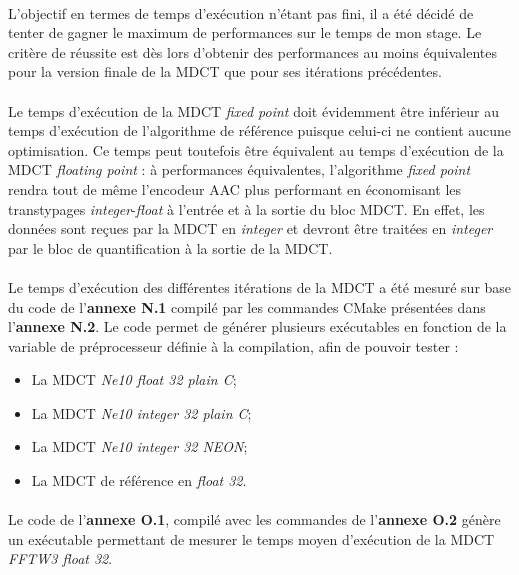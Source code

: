 \documentclass{article}
\begin{document}
    \paragraph{}
    L'objectif en termes de temps d'exécution n'étant pas fini, il a été décidé de tenter de gagner le maximum de performances sur le temps de mon stage. Le critère de réussite est dès lors d'obtenir des performances au moins équivalentes pour la version finale de la MDCT que pour ses itérations précédentes.

    \paragraph{}
    Le temps d'exécution de la MDCT \emph{fixed point} doit évidemment être inférieur au temps d'exécution de l'algorithme de référence puisque celui-ci ne contient aucune optimisation. Ce temps peut toutefois être équivalent au temps d'exécution de la MDCT \emph{floating point} : à performances équivalentes, l'algorithme \emph{fixed point} rendra tout de même l'encodeur AAC plus performant en économisant les transtypages \emph{integer}-\emph{float} à l'entrée et à la sortie du bloc MDCT. En effet, les données sont reçues par la MDCT en \emph{integer} et devront être traitées en \emph{integer} par le bloc de quantification à la sortie de la MDCT.

    \paragraph{}
    Le temps d'exécution des différentes itérations de la MDCT a été mesuré sur base du code de l'\textbf{annexe N.1} compilé par les commandes CMake présentées dans l'\textbf{annexe N.2}. Le code permet de générer plusieurs exécutables en fonction de la variable de préprocesseur définie à la compilation, afin de pouvoir tester :
    \begin{itemize}
        \item La MDCT \emph{Ne10 float 32 plain C};
        \item La MDCT \emph{Ne10 integer 32 plain C};
        \item La MDCT \emph{Ne10 integer 32 NEON};
        \item La MDCT de référence en \emph{float 32}.
    \end{itemize}

    \paragraph{}
    Le code de l'\textbf{annexe O.1}, compilé avec les commandes de l'\textbf{annexe O.2} génère un exécutable permettant de mesurer le temps moyen d'exécution de la MDCT \emph{FFTW3 float 32}.
    
\end{document}
